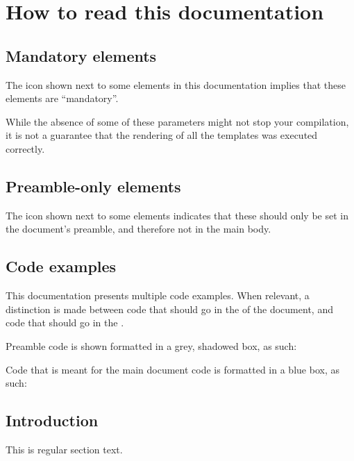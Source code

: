 \section{How to read this documentation}
\label{sec:documentation-help}

\subsection*{Mandatory elements}
\label{sec:mandatory-comm}
%

The \mandatory{} icon shown next to some elements in this documentation
implies that these elements are \enquote{mandatory}. %

While the absence of some of these parameters might not stop your
compilation, it is not a guarantee that the rendering of all the templates
was executed correctly. %

\subsection*{Preamble-only elements}
\label{sec:preamble-only}

The \preambleonly{} icon shown next to some elements indicates that these
should only be set in the document's preamble, and therefore not in the
main body. %

\subsection*{Code examples}
\label{sec:code-examples}

This documentation presents multiple code examples. %
When relevant, a distinction is made between code that should go in the
 of the document, and code that should go in the
. %

Preamble code is shown formatted in a grey, shadowed box, as such: %
\begin{preamblecode}
  \hypersetup{hidelinks} %
\end{preamblecode}

Code that is meant for the main document code is formatted in a blue box,
as such: %

\begin{bodycode}
  \section{Introduction}

  This is regular section text.
\end{bodycode}

